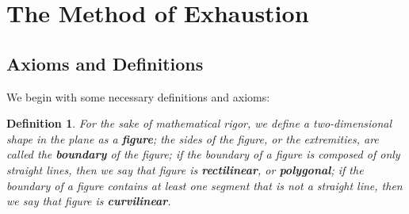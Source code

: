 \documentclass[letterpaper, 12pt]{amsart}
\newtheorem{defn}[thm]{Definition}
\theoremstyle{definition}  %
\begin{document}


	\section{The Method of Exhaustion}
	\label{sec:the_method_of_exhaustion}
		\subsection{Axioms and Definitions}
		\label{sub:axioms_and_definitions}

		We begin with some necessary definitions and axioms:

		\begin{defn}
		\label{defn:fig}
		For the sake of mathematical rigor, we define a two-dimensional shape in the plane as a \textbf{figure}; the sides of the figure, or the extremities, are called the \textbf{boundary} of the figure; if the boundary of a figure is composed of only straight lines, then we say that figure is \textbf{rectilinear}, or \textbf{polygonal}; if the boundary of a figure contains at least one segment that is not a straight line, then we say that figure is \textbf{curvilinear}.
		\end{defn}
\end{document}
